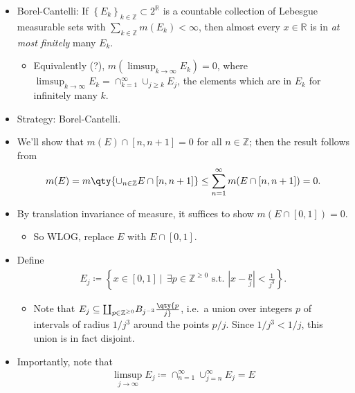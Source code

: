 \begin{solution}

\hfill

\begin{concept}

\hfill

\begin{itemize}
\tightlist
\item
  Borel-Cantelli: If
  \(\left\{{E_k}\right\}_{k\in{\mathbb{Z}}}\subset 2^{\mathbb{R}}\) is a
  countable collection of Lebesgue measurable sets with
  \(\sum_{k\in {\mathbb{Z}}} m(E_k) < \infty\), then almost every
  \(x\in {\mathbb{R}}\) is in \emph{at most finitely} many \(E_k\).

  \begin{itemize}
  \tightlist
  \item
    Equivalently (?), \(m(\limsup_{k\to\infty} E_k) = 0\), where
    \(\limsup_{k\to\infty} E_k = \cap_{k=1}^\infty \cup_{j\geq k} E_j\),
    the elements which are in \(E_k\) for infinitely many \(k\).
  \end{itemize}
\end{itemize}

\end{concept}

\begin{itemize}
\item
  Strategy: Borel-Cantelli.
\item
  We'll show that \(m(E) \cap[n, n+1] = 0\) for all
  \(n\in {\mathbb{Z}}\); then the result follows from
  \begin{align*}
  m(E) = m \qty{\cup_{n\in {\mathbb{Z}}} E \cap[n, n+1]} \leq \sum_{n=1}^\infty m(E \cap[n, n+1]) = 0
  .\end{align*}
\item
  By translation invariance of measure, it suffices to show
  \(m(E \cap[0, 1]) = 0\).

  \begin{itemize}
  \tightlist
  \item
    So WLOG, replace \(E\) with \(E\cap[0, 1]\).
  \end{itemize}
\item
  Define
  \begin{align*}
  E_j \coloneqq\left\{{x\in [0, 1] {~\mathrel{\Big|}~}\
  \exists p\in {\mathbb{Z}}^{\geq 0} \text{ s.t. } {\left\lvert {x - \frac{p}{j} } \right\rvert} < \frac 1 {j^3}}\right\} 
  .\end{align*}

  \begin{itemize}
  \tightlist
  \item
    Note that
    \(E_j \subseteq {\coprod}_{p\in {\mathbb{Z}}^{\geq 0}} B_{j^{-3}}\qty{p\over j}\),
    i.e.~a union over integers \(p\) of intervals of radius \(1/j^3\)
    around the points \(p/j\). Since \(1/j^3 < 1/j\), this union is in
    fact disjoint.
  \end{itemize}
\item
  Importantly, note that
  \begin{align*}
  \limsup_{j\to\infty} E_j \coloneqq\cap_{n=1}^\infty \cup_{j=n}^\infty E_j = E
  \end{align*}


\end{itemize}
\end{solution}
